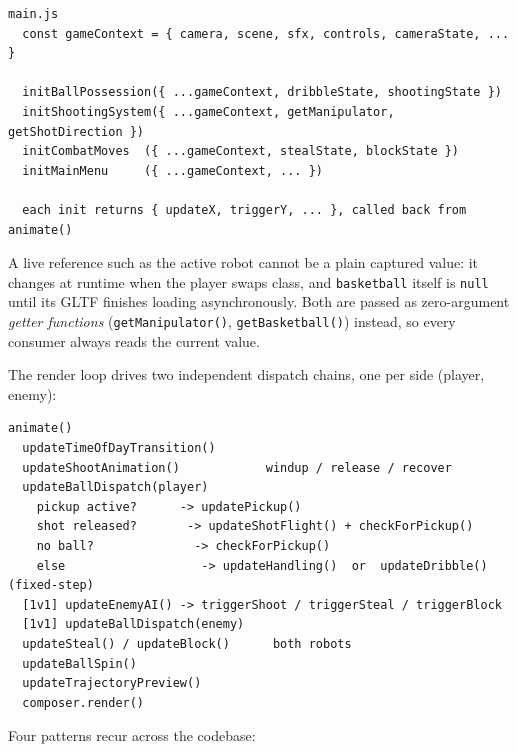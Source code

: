 \documentclass[11pt,a4paper]{article}
\newcommand{\code}[1]{\texttt{#1}}
\begin{document}
\begin{verbatim}
main.js
  const gameContext = { camera, scene, sfx, controls, cameraState, ... }

  initBallPossession({ ...gameContext, dribbleState, shootingState })
  initShootingSystem({ ...gameContext, getManipulator, getShotDirection })
  initCombatMoves  ({ ...gameContext, stealState, blockState })
  initMainMenu     ({ ...gameContext, ... })

  each init returns { updateX, triggerY, ... }, called back from animate()
\end{verbatim}

A live reference such as the active robot cannot be a plain captured value: it changes at runtime when the player swaps class, and \code{basketball} itself is \code{null} until its GLTF finishes loading asynchronously. Both are passed as zero-argument \emph{getter functions} (\code{getManipulator()}, \code{getBasketball()}) instead, so every consumer always reads the current value.

The render loop drives two independent dispatch chains, one per side (player, enemy):

\begin{verbatim}
animate()
  updateTimeOfDayTransition()
  updateShootAnimation()            windup / release / recover
  updateBallDispatch(player)
    pickup active?      -> updatePickup()
    shot released?       -> updateShotFlight() + checkForPickup()
    no ball?              -> checkForPickup()
    else                   -> updateHandling()  or  updateDribble()  (fixed-step)
  [1v1] updateEnemyAI() -> triggerShoot / triggerSteal / triggerBlock
  [1v1] updateBallDispatch(enemy)
  updateSteal() / updateBlock()      both robots
  updateBallSpin()
  updateTrajectoryPreview()
  composer.render()
\end{verbatim}

Four patterns recur across the codebase:
\end{document}
